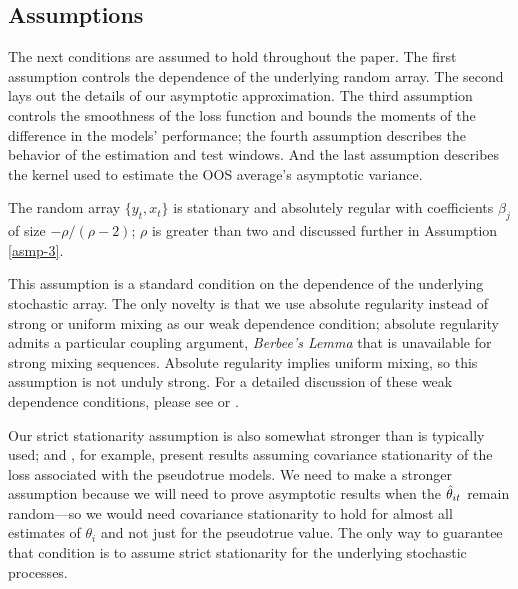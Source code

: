 \documentclass[12pt]{article}
\begin{document}
\subsection{Assumptions}
\label{sec:asmp}

The next conditions are assumed to hold throughout the paper.  The first
assumption controls the dependence of the underlying random array.
The second lays out the details of our asymptotic approximation.
The third assumption controls the
smoothness of the loss function and bounds the moments of the
difference in the models' performance; the fourth assumption describes
the behavior of the estimation and test windows.  And the last
assumption describes the kernel used to estimate the OOS average's
asymptotic variance.

\begin{asmp}\label{asmp-1}
  The random array $\{y_t,x_t\}$ is stationary and absolutely regular
  with coefficients $\beta_j$ of size $-\rho/(\rho-2)$; $\rho$ is
  greater than two and discussed further in Assumption \ref{asmp-3}.
\end{asmp}

This assumption is a standard condition on the dependence of the
underlying stochastic array. The only novelty is that we use
absolute regularity instead of strong or uniform mixing as our
weak dependence condition; absolute regularity admits a particular
coupling argument, \emph{Berbee's Lemma} \citep[reproduced in this
paper as Lemma A.1 for reference]{Ber:79} that is
unavailable for strong mixing sequences. Absolute regularity
implies uniform mixing, so this assumption is not unduly strong.
For a detailed discussion of these weak dependence conditions,
please see \citet{Dav:94} or \citet{Dou:94}.

Our strict stationarity assumption is also somewhat stronger than is
typically used; \citet{Wes:96} and \citet{Mcc:07}, for example,
present results assuming covariance stationarity of the loss
associated with the pseudotrue models. We need to make a stronger
assumption because we will need to prove asymptotic results when the
$\hat\theta_{it}$ remain random---so we would need covariance stationarity to
hold for almost all estimates of $\theta_i$ and not just for the
pseudotrue value. The only way to guarantee that condition is to
assume strict stationarity for the underlying stochastic processes.
\end{document}

